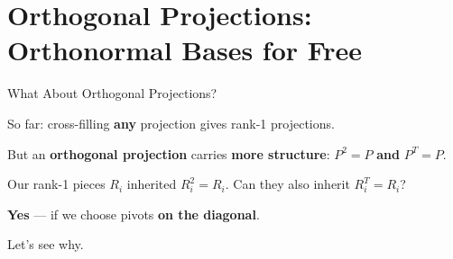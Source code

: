 \documentclass[10pt]{beamer}
\theoremstyle{definition}
\newcommand{\x}[1]{\alert{\textbf{#1}}}
\begin{document}
\section{Orthogonal Projections: Orthonormal Bases for Free}

\begin{frame}{What About Orthogonal Projections?}

So far: cross-filling \x{any} projection gives rank-1 projections.

\vspace{0.5em}

But an \x{orthogonal projection} carries \x{more structure}: $P^2 = P$ \x{and} $P^T = P$.

\vspace{0.5em}

Our rank-1 pieces $R_i$ inherited $R_i^2 = R_i$. \quad Can they also inherit $R_i^T = R_i$?

\vspace{1em}

\x{Yes} --- if we choose pivots \x{on the diagonal}.

\vspace{0.5em}

Let's see why.

\end{frame}
\end{document}
